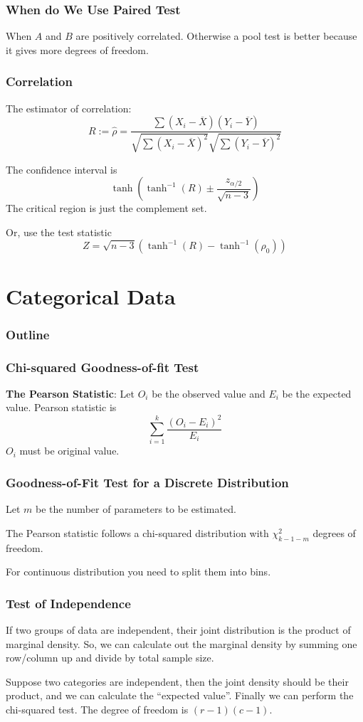 \documentclass{beamer}
\begin{document}
\begin{frame}
    \frametitle{When do We Use Paired Test}

    When $A$ and $B$ are positively correlated. Otherwise a pool test is better because it gives more degrees of freedom.

\end{frame}

\begin{frame}
    \frametitle{Correlation}

    The estimator of correlation:
    \[R:=\hat{\rho}=\frac{\sum(X_i-\overline{X})(Y_i-\overline{Y})}{\sqrt{\sum(X_i-\overline{X})^2}\sqrt{\sum(Y_i-\overline{Y})^2}}\]

    The confidence interval is 
    \[\tanh(\tanh^{-1}(R)\pm \frac{z_{\alpha/2}}{\sqrt{n-3}})\]
    The critical region is just the complement set.\par
    Or, use the test statistic
    \[Z=\sqrt{n-3}(\tanh^{-1}(R)-\tanh^{-1}(\rho_0))\]

\end{frame}

\section{Categorical Data}
\begin{frame}
    \frametitle{Outline}
    \tableofcontents[currentsection]
\end{frame}

\begin{frame}
    \frametitle{Chi-squared Goodness-of-fit Test}

    \textbf{The Pearson Statistic}: Let $O_i$ be the observed value and $E_i$ be the expected value. Pearson statistic is 
    \[\sum\limits_{i=1}^{k}\frac{(O_i-E_i)^2}{E_i}\]
    $O_i$ must be original value.

\end{frame}

\begin{frame}
    \frametitle{Goodness-of-Fit Test for a Discrete Distribution}
    Let $m$ be the number of parameters to be estimated. \par
    The Pearson statistic follows a chi-squared distribution with $\chi^2_{k-1-m}$ degrees of freedom.\par
    For continuous distribution you need to split them into bins.

\end{frame}

\begin{frame}
    \frametitle{Test of Independence}

    If two groups of data are independent, their joint distribution is the product of marginal density. So, we can calculate out the marginal density by summing one row/column up and divide by total sample size.\par
    Suppose two categories are independent, then the joint density should be their product, and we can calculate the ``expected value''. Finally we can perform the chi-squared test. The degree of freedom is $(r-1)(c-1)$.

\end{frame}
\end{document}
